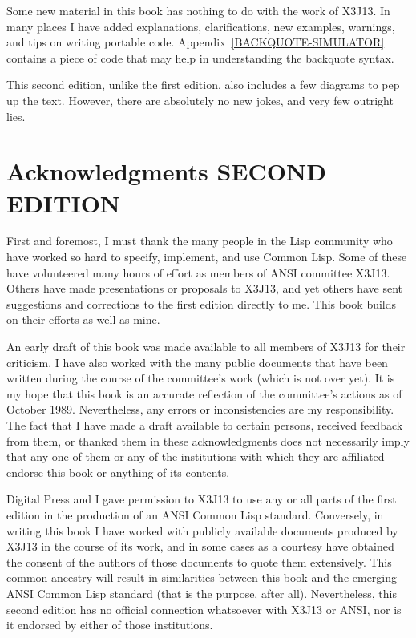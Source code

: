 Some new material in this book has nothing to do with the work of X3J13.
In many places I have added explanations, clarifications, new examples,
warnings, and tips on writing portable code.
Appendix~\ref{BACKQUOTE-SIMULATOR} contains a piece of code
that may help in understanding the backquote syntax.

This second edition,
unlike the first edition, also includes a few diagrams to pep up the text.
However, there are absolutely no new jokes, and very few outright lies.


\chapter*{Acknowledgments SECOND EDITION}

First and foremost, I must thank the many people in the Lisp
community who have worked so hard to specify, implement, and use
Common Lisp.  Some of these have volunteered many hours
of effort as members of ANSI committee X3J13.  Others
have made presentations or proposals to X3J13, and yet others
have sent suggestions and corrections to the first edition directly to me.
This book builds on their efforts as well as mine.


An early draft of this book was made available to all members
of X3J13 for their criticism.  I have also worked with
the many public documents that have been written during the course
of the committee's work (which is not over yet).
It is my hope that this book is an accurate reflection of the
committee's actions as of October 1989.
Nevertheless, any errors or inconsistencies are my responsibility.
The fact that I have made a draft available to certain persons,
received feedback from them, or thanked them in these
acknowledgments does not necessarily imply that any one of them
or any of the institutions with which they are affiliated endorse this book
or anything of its contents.

Digital Press and I gave permission to X3J13 to use any or all parts
of the first edition in the production of an ANSI Common Lisp standard.
Conversely, in writing this book I have worked with publicly available
documents produced by X3J13 in the course of its work, and in some cases
as a courtesy have obtained the consent of the authors of those documents
to quote them extensively.  This common ancestry will result in similarities
between this book and the emerging ANSI Common Lisp standard (that is the
purpose, after all).  Nevertheless, this second edition 
has no official connection whatsoever
with X3J13 or ANSI, nor is it endorsed by either of those institutions.

